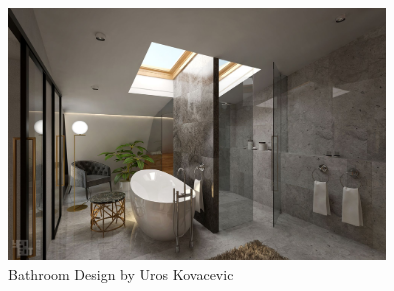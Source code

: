 \begin{figure}
	\centering
		\includegraphics[width=10cm]{img/bath2.jpg}
	\caption{Bathroom Design by Uros Kovacevic}
	\label{fig:6}
\end{figure}






